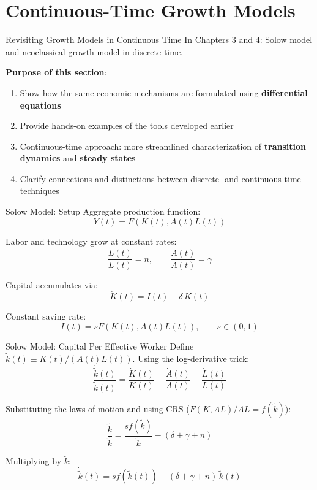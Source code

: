 \documentclass[blue]{beamer}
\begin{document}
\section{Continuous-Time Growth Models}

\begin{frame}{Revisiting Growth Models in Continuous Time}
	In Chapters 3 and 4: Solow model and neoclassical growth model in discrete time.
	
	\bigskip
	\textbf{Purpose of this section}:
	\begin{enumerate}
		\item Show how the same economic mechanisms are formulated using \textbf{differential equations}
		\item Provide hands-on examples of the tools developed earlier
		\item Continuous-time approach: more streamlined characterization of \textbf{transition dynamics} and \textbf{steady states}
		\item Clarify connections and distinctions between discrete- and continuous-time techniques
	\end{enumerate}
\end{frame}

\begin{frame}{Solow Model: Setup}
	Aggregate production function:
	\[
	Y(t) = F(K(t), A(t)L(t))
	\]
	
	Labor and technology grow at constant rates:
	\[
	\frac{\dot{L}(t)}{L(t)} = n, \qquad \frac{\dot{A}(t)}{A(t)} = \gamma
	\]
	
	Capital accumulates via:
	\[
	\dot{K}(t) = I(t) - \delta\, K(t)
	\]
	
	Constant saving rate:
	\[
	I(t) = s F(K(t),A(t)L(t)), \qquad s \in (0,1)
	\]
\end{frame}


\begin{frame}{Solow Model: Capital Per Effective Worker}
	Define $\tilde{k}(t) \equiv K(t)/(A(t)L(t))$. Using the log-derivative trick:
	\[
	\frac{\dot{\tilde{k}}(t)}{\tilde{k}(t)} = \frac{\dot{K}(t)}{K(t)} - \frac{\dot{A}(t)}{A(t)} - \frac{\dot{L}(t)}{L(t)}
	\]
	
	Substituting the laws of motion and using CRS ($F(K, AL)/AL = f(\tilde{k})$):
	\[
	\frac{\dot{\tilde{k}}}{\tilde{k}} = \frac{sf(\tilde{k})}{\tilde{k}} - (\delta + \gamma + n)
	\]
	
	Multiplying by $\tilde{k}$:
	\[
	{\dot{\tilde{k}}(t) = sf(\tilde{k}(t)) - (\delta + \gamma + n)\, \tilde{k}(t)}
	\]
	
\end{frame}
\end{document}
